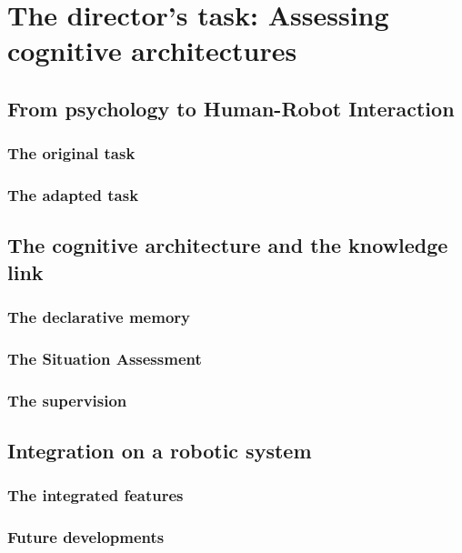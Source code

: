 \ifdefined{}
\else
\setcounter{chapter}{8} %
\dominitoc
\faketableofcontents
\fi

\chapter{The director's task: Assessing cognitive architectures}
\minitoc

\section{From psychology to Human-Robot Interaction}

\subsection{The original task}

\subsection{The adapted task}


\section{The cognitive architecture and the knowledge link}

\subsection{The declarative memory}

\subsection{The Situation Assessment}

\subsection{The supervision}


\section{Integration on a robotic system}

\subsection{The integrated features}

\subsection{Future developments}